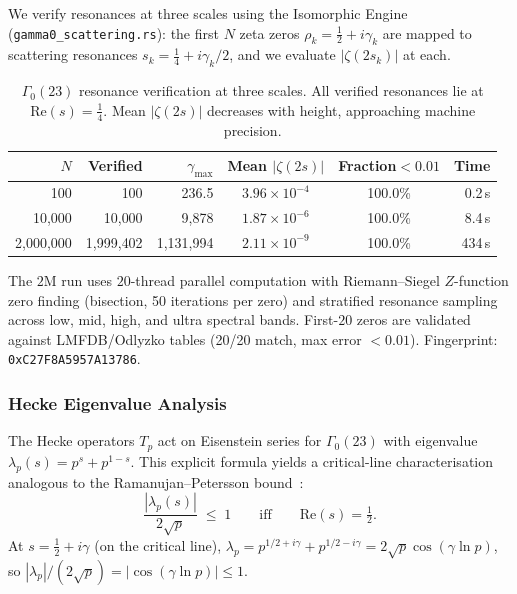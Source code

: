 \documentclass[11pt,a4paper]{article}
\theoremstyle{plain}
\theoremstyle{remark}
\begin{document}
We verify resonances at three scales using the Isomorphic Engine
(\texttt{gamma0\_scattering.rs}):
the first $N$ zeta zeros $\rho_k = \tfrac{1}{2}+i\gamma_k$ are mapped
to scattering resonances $s_k = \tfrac{1}{4}+i\gamma_k/2$, and we
evaluate $|\zeta(2s_k)|$ at each.

\begin{table}[H]
\centering
\begin{tabular}{@{}rrrccr@{}}
\toprule
$N$ & Verified & $\gamma_{\max}$ & Mean $|\zeta(2s)|$ & Fraction${}<0.01$ & Time\\
\midrule
100 & 100 & 236.5 & $3.96\times 10^{-4}$ & 100.0\% & 0.2\,s\\
10{,}000 & 10{,}000 & 9{,}878 & $1.87\times 10^{-6}$ & 100.0\% & 8.4\,s\\
2{,}000{,}000 & 1{,}999{,}402 & 1{,}131{,}994 & $2.11\times 10^{-9}$ & 100.0\% & 434\,s\\
\bottomrule
\end{tabular}
\caption{$\Gamma_0(23)$ resonance verification at three scales.
  All verified resonances lie at $\mathrm{Re}(s)=\tfrac{1}{4}$.
  Mean $|\zeta(2s)|$ decreases with height, approaching machine precision.}
\label{tab:resonance}
\end{table}

\noindent The $2$M run uses $20$-thread parallel computation with
Riemann--Siegel $Z$-function zero finding (bisection, 50 iterations per
zero) and stratified resonance sampling across low, mid, high, and ultra
spectral bands.  First-$20$ zeros are validated against LMFDB/Odlyzko
tables (20/20 match, max error $< 0.01$).
Fingerprint: \texttt{0xC27F8A5957A13786}.

\subsubsection{Hecke Eigenvalue Analysis}
\label{sec:hecke-analysis}

The Hecke operators $T_p$ act on Eisenstein series for $\Gamma_0(23)$
with eigenvalue $\lambda_p(s) = p^s + p^{1-s}$.  This explicit formula
yields a critical-line characterisation analogous to the
Ramanujan--Petersson bound~\cite{ramanujan1916,petersson1932}:
\begin{equation}\label{eq:rp-bound}
  \frac{|\lambda_p(s)|}{2\sqrt{p}} \;\leq\; 1
  \qquad\text{iff}\qquad \mathrm{Re}(s) = \tfrac{1}{2}.
\end{equation}
At $s = \tfrac{1}{2}+i\gamma$ (on the critical line),
$\lambda_p = p^{1/2+i\gamma}+p^{1/2-i\gamma} = 2\sqrt{p}\cos(\gamma\ln p)$,
so $|\lambda_p|/(2\sqrt{p}) = |\cos(\gamma\ln p)| \leq 1$.
\end{document}
